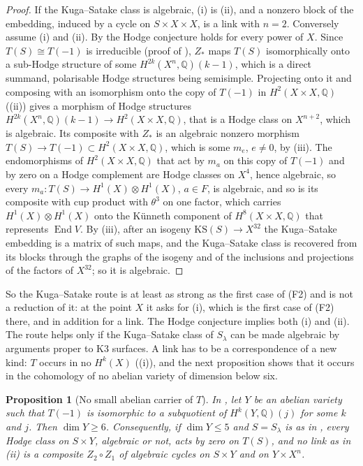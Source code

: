 \documentclass[11pt,reqno]{amsart}
\theoremstyle{plain}
\newtheorem{proposition}[theorem]{Proposition}
\theoremstyle{definition}
\theoremstyle{remark}
\newcommand{\QQ}{\mathbb{Q}}
\DeclareMathOperator{\End}{End}
\begin{document}
\begin{proof}
If the Kuga--Satake class is algebraic, (i) is (ii), and a
nonzero block of the embedding, induced by a cycle on $S\times X\times X$, is
a link with $n=2$. Conversely assume (i) and (ii). By
 the Hodge conjecture holds for every power of $X$.
Since $T(S)\cong T(-1)$ is irreducible (proof of ),
$Z_{*}$ maps $T(S)$ isomorphically onto a sub-Hodge structure of some
$H^{2k}(X^{n},\QQ)(k-1)$, which is a direct summand, polarisable Hodge
structures being semisimple. Projecting onto it and composing with an
isomorphism onto the copy of $T(-1)$ in $H^{2}(X\times X,\QQ)$
((ii)) gives a morphism of Hodge structures
$H^{2k}(X^{n},\QQ)(k-1)\to H^{2}(X\times X,\QQ)$, that is a Hodge class on
$X^{n+2}$, which is algebraic. Its composite with $Z_{*}$ is an algebraic
nonzero morphism $T(S)\to T(-1)\subset H^{2}(X\times X,\QQ)$, which is some
$m_{e}$, $e\ne0$, by (iii). The endomorphisms of
$H^{2}(X\times X,\QQ)$ that act by $m_{a}$ on this copy of $T(-1)$ and by zero
on a Hodge complement are Hodge classes on $X^{4}$, hence algebraic, so every
$m_{a}\colon T(S)\to H^{1}(X)\otimes H^{1}(X)$, $a\in F$, is algebraic, and so is
its composite with cup product with $\theta^{3}$ on one factor, which carries
$H^{1}(X)\otimes H^{1}(X)$ onto the K\"unneth component of $H^{8}(X\times X,\QQ)$
that represents $\End V$. By (iii), after an isogeny
$\mathrm{KS}(S)\to X^{32}$ the Kuga--Satake embedding is a matrix of such
maps, and the Kuga--Satake class is recovered from its blocks through the
graphs of the isogeny and of the inclusions and projections of the factors of
$X^{32}$; so it is algebraic.
\end{proof}

So the Kuga--Satake route is at least as strong as the first case of (F2) and
is not a reduction of it: at the point $X$ it asks for (i), which is the first
case of (F2) there, and in addition for a link. The Hodge conjecture
implies both (i) and (ii). The route helps only if the
Kuga--Satake class of $S_{\lambda}$ can be made algebraic by arguments proper
to K3 surfaces. A link has to be a correspondence of a new kind: $T$ occurs
in no $H^{k}(X)$ ((i)), and the next proposition
shows that it occurs in the cohomology of no abelian variety of dimension
below six.

\begin{proposition}[No small abelian carrier of $T$]\label{prop:mumfordcarrier}
In , let $Y$ be an abelian variety such that $T(-1)$ is
isomorphic to a subquotient of $H^{k}(Y,\QQ)(j)$ for some $k$ and $j$. Then
$\dim Y\ge6$. Consequently, if $\dim Y\le5$ and $S=S_{\lambda}$ is as in
, every Hodge class on $S\times Y$, algebraic or not, acts
by zero on $T(S)$, and no link as in (ii) is a
composite $Z_{2}\circ Z_{1}$ of algebraic cycles on $S\times Y$ and on
$Y\times X^{n}$.
\end{proposition}
\end{document}
